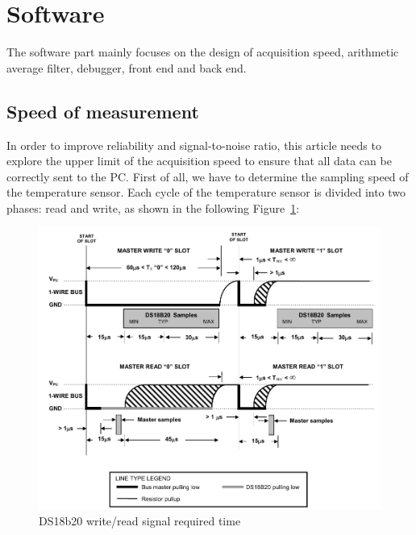 \section{Software}
\label{sec:Software}
The software part mainly focuses on the design of acquisition speed, arithmetic average filter, debugger, front end and back end.

\subsection{Speed of measurement}
\label{sec:Speed of measurement}
In order to improve reliability and signal-to-noise ratio, this article needs to explore the upper limit of the acquisition speed to ensure that all data can be correctly sent to the PC.
First of all, we have to determine the sampling speed of the temperature sensor. Each cycle of the temperature sensor is divided into two phases: read and write, as shown in the following Figure~\ref{fig:5.5}:
\begin{figure}[!ht]
	\centering
	\includegraphics[width=16cm]{grafiken/5.5.pdf}
	\caption{DS18b20 write/read signal required time} 
	\label{fig:5.5}
\end{figure}
\FloatBarrier

